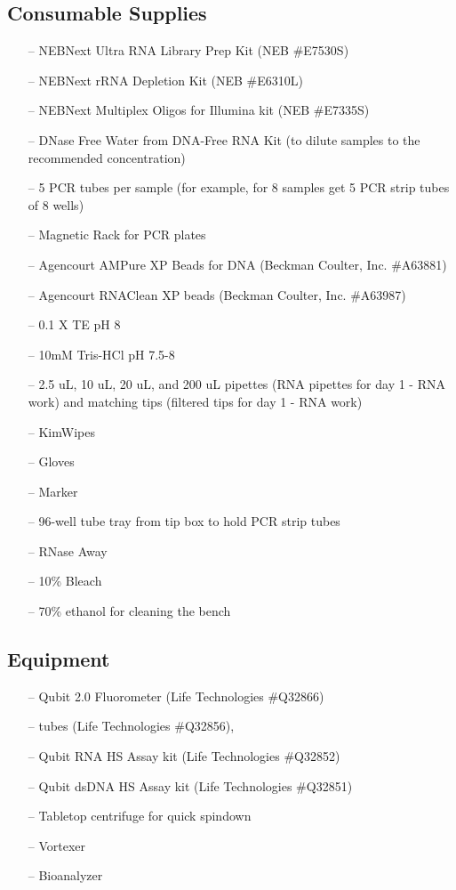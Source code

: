\documentclass[11pt, oneside]{article}
\begin{document}
	\subsection{Consumable Supplies}
	
		\vspace{3mm}
		
		\begin{itemize}
			\itemsep0em
			\item[--] NEBNext Ultra RNA Library Prep Kit (NEB \#E7530S)
			\item[--] NEBNext rRNA Depletion Kit (NEB \#E6310L)
			\item[--] NEBNext Multiplex Oligos for Illumina kit (NEB \#E7335S)
			\item[--] DNase Free Water from DNA-Free RNA Kit (to dilute samples to the recommended concentration)
			\item[--] 5 PCR tubes per sample (for example, for 8 samples get 5 PCR strip tubes of 8 wells)
			\item[--] Magnetic Rack for PCR plates 
			\item[--] Agencourt AMPure XP Beads for DNA (Beckman Coulter, Inc. \#A63881)
			\item[--] Agencourt RNAClean XP beads (Beckman Coulter, Inc. \#A63987)
			\item[--] 0.1 X TE pH 8
			\item[--] 10mM Tris-HCl pH 7.5-8
			\item[--] 2.5 uL, 10 uL, 20 uL, and 200 uL pipettes (RNA pipettes for day 1 - RNA work) and matching tips (filtered tips for day 1 - RNA work)
			\item[--] KimWipes
			\item[--] Gloves
			\item[--] Marker
			\item[--] 96-well tube tray from tip box to hold PCR strip tubes
			\item[--] RNase Away
			\item[--] 10\% Bleach
			\item[--] 70\% ethanol for cleaning the bench 
		\end{itemize}
			
		\vspace{3mm}	
			
	\subsection{Equipment}
		
		\begin{itemize}
			\itemsep0em
			\item[--] Qubit 2.0 Fluorometer (Life Technologies \#Q32866)
			\item[--] tubes (Life Technologies \#Q32856), 
			\item[--] Qubit RNA HS Assay kit (Life Technologies \#Q32852)
			\item[--] Qubit dsDNA HS Assay kit (Life Technologies \#Q32851)
			\item[--] Tabletop centrifuge for quick spindown
			\item[--] Vortexer	
			\item[--] Bioanalyzer
		\end{itemize}
		
\end{document}

